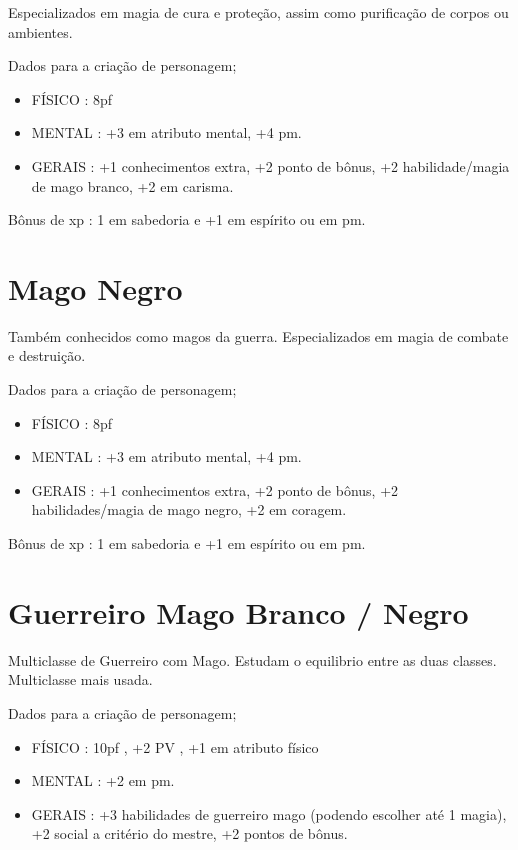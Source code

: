 Especializados em magia de cura e proteção, assim como purificação de corpos ou ambientes.

Dados para a criação de personagem;

\begin{itemize}

	\item FÍSICO : 8pf

	\item MENTAL : +3 em atributo mental, +4 pm. 

	\item GERAIS : +1 conhecimentos extra, +2 ponto de bônus, +2 habilidade/magia de mago branco, +2 em carisma.

\end{itemize}

Bônus de xp : 1 em sabedoria e +1 em espírito ou em pm.

\section{Mago Negro}

Também conhecidos como magos da guerra. Especializados em magia de combate e destruição.

Dados para a criação de personagem;

\begin{itemize}

	\item FÍSICO : 8pf

	\item MENTAL : +3 em atributo mental, +4 pm. 

	\item GERAIS : +1 conhecimentos extra, +2 ponto de bônus, +2 habilidades/magia de mago negro, +2 em coragem.

\end{itemize}

Bônus de xp : 1 em sabedoria e +1 em espírito ou em pm.

\section{Guerreiro Mago Branco / Negro}

Multiclasse de Guerreiro com Mago. Estudam o equilibrio entre as duas classes. Multiclasse mais usada. 

Dados para a criação de personagem;

\begin{itemize}


	\item FÍSICO : 10pf , +2 PV , +1 em atributo físico 

	\item MENTAL : +2 em pm.

	\item GERAIS : +3 habilidades de guerreiro mago (podendo escolher até 1 magia), +2 social a critério do mestre, +2 pontos de bônus.

\end{itemize}

